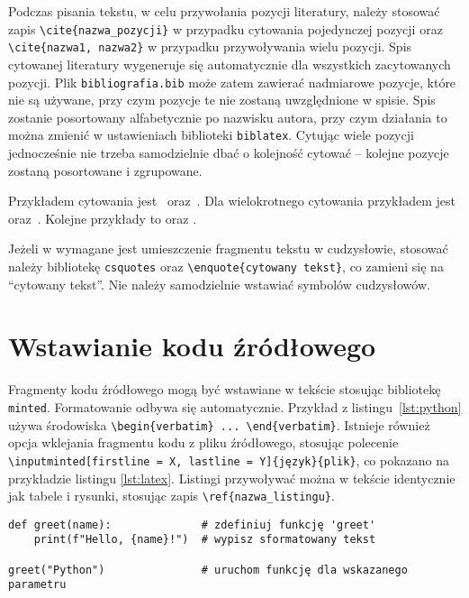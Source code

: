 Podczas pisania tekstu, w celu przywołania pozycji literatury, należy stosować zapis \verb|\cite{nazwa_pozycji}| w przypadku cytowania pojedynczej pozycji oraz \verb|\cite{nazwa1, nazwa2}| w przypadku przywoływania wielu pozycji. Spis cytowanej literatury wygeneruje się automatycznie dla wszystkich zacytowanych pozycji. Plik \verb|bibliografia.bib| może zatem zawierać nadmiarowe pozycje, które nie są używane, przy czym pozycje te nie zostaną uwzględnione w spisie. Spis zostanie posortowany alfabetycznie po nazwisku autora, przy czym działania to można zmienić w ustawieniach biblioteki \verb|biblatex|. Cytując wiele pozycji jednocześnie nie trzeba samodzielnie dbać o kolejność cytować -- kolejne pozycje zostaną posortowane i zgrupowane.

Przykładem cytowania jest~\cite{ksiazka_1} oraz~\cite{rozdzial_ksiazki_2}. Dla wielokrotnego cytowania przykładem jest~\cite{materialy_konferencyjne_3, artykul_4, raport_5} oraz~\cite{ksiazka_1, teza_8, materialy_konferencyjne_3, artykul_4, raport_5, instrukcja_6}. Kolejne przykłady to \cite{instrukcja_6} oraz \cite{strona_7, teza_8}.

Jeżeli w wymagane jest umieszczenie fragmentu tekstu w cudzysłowie, stosować należy bibliotekę \verb|csquotes| oraz \verb|\enquote{cytowany tekst}|, co zamieni się na \enquote{cytowany tekst}. Nie należy samodzielnie wstawiać symbolów cudzysłowów.

\section{Wstawianie kodu źródłowego}

Fragmenty kodu źródłowego mogą być wstawiane w tekście stosując bibliotekę \verb|minted|. Formatowanie odbywa się automatycznie. Przykład z listingu~\ref{lst:python} używa środowiska \verb|\begin{verbatim} ... \end{verbatim}|. Istnieje również opcja wklejania fragmentu kodu z pliku źródłowego, stosując polecenie \verb|\inputminted[firstline = X, lastline = Y]{język}{plik}|, co pokazano na przykładzie listingu \ref{lst:latex}. Listingi przywoływać można w tekście identycznie jak tabele i rysunki, stosując zapis \verb|\ref{nazwa_listingu}|.

\begin{listing}[ht!]
\begin{verbatim}
def greet(name):              # zdefiniuj funkcję 'greet'
    print(f"Hello, {name}!")  # wypisz sformatowany tekst

greet("Python")               # uruchom funkcję dla wskazanego parametru
\end{verbatim}
\end{listing}

